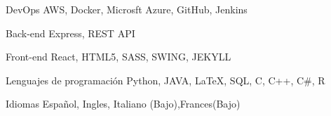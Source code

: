 

\begin{cvskills}

  \cvskill
    {DevOps} %
    {AWS, Docker, Microsft Azure, GitHub, Jenkins} %

  \cvskill
    {Back-end} %
    {Express, REST API} %

  \cvskill
    {Front-end} %
    {React, HTML5, SASS, SWING, JEKYLL} %

  \cvskill
    {Lenguajes de programación} %
    {Python, JAVA, LaTeX, SQL, C, C++, C\#, R} %

  \cvskill
    {Idiomas} %
    {Español, Ingles, Italiano (Bajo),Frances(Bajo) } %

\end{cvskills}
